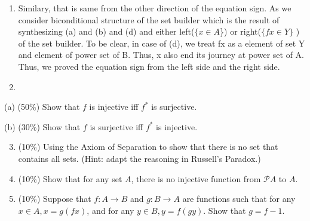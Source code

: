 \documentclass[10pt]{article}
\begin{document}
\begin{enumerate}
\begin{enumerate}
    \item Similary, that is same from the other direction of the equation sign. As we consider biconditional structure of the set builder which is the result of synthesizing (a) and (b) and (d) and either left($\{x \in A$\}) or right($\{f x \in Y\}$ ) of the set builder. To be clear, in case of (d), we treat fx as a element of set Y and element of power set of B. Thus, x also end its journey at power set of A. Thus, we proved the equation sign from the left side and the right side.
    \item 
  \end{enumerate}
\end{enumerate}
(a) (50\%) Show that $f$ is injective iff $f^{*}$ is surjective.

(b) (30\%) Show that $f$ is surjective iff $f^{*}$ is injective.

\begin{enumerate}
  \setcounter{enumi}{2}
  \item (10\%) Using the Axiom of Separation to show that there is no set that contains all sets. (Hint: adapt the reasoning in Russell's Paradox.)

  \item (10\%) Show that for any set $A$, there is no injective function from $\mathscr{P} A$ to $A$.

  \item (10\%) Suppose that $f: A \rightarrow B$ and $g: B \rightarrow A$ are functions such that for any $x \in A, x=g(f x)$, and for any $y \in B, y=f(g y)$. Show that $g=f-1$.

\end{enumerate}
\end{document}
